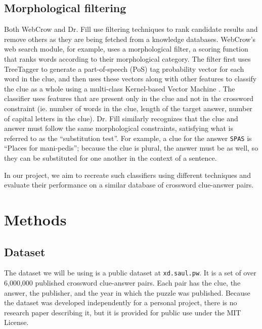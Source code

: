 \documentclass[11pt,a4paper]{article}
\begin{document}
\subsection{Morphological filtering}
Both WebCrow and Dr. Fill use filtering techniques to rank candidate results and remove others as they are being fetched from a knowledge databases. WebCrow's web search module, for example, uses a morphological filter, a scoring function that ranks words according to their morphological category. The filter first uses TreeTagger \cite{Schmid95-Improvements} to generate a part-of-speech (PoS) tag probability vector for each word in the clue, and then uses these vectors along with other features to classify the clue as a whole using a multi-class Kernel-based Vector Machine \cite{Tsochantaridis04-Support}. The classifier uses features that are present only in the clue and not in the crossword constraint (ie. number of words in the clue, length of the target answer, number of capital letters in the clue). Dr. Fill similarly recognizes that the clue and answer must follow the same morphological constraints, satisfying what is referred to as the ``substitution test''. For example, a clue for the answer \verb.SPAS. is ``Places for mani-pedis''; because the clue is plural, the answer must be as well, so they can be substituted for one another in the context of a sentence. 

In our project, we aim to recreate such classifiers using different techniques and evaluate their performance on a similar database of crossword clue-answer pairs.

\section{Methods}

\subsection{Dataset}
The dataset we will be using is a public dataset at \verb,xd.saul.pw,. It is a set of over 6,000,000 published crossword clue-answer pairs. Each pair has the clue, the answer, the publisher, and the year in which the puzzle was published. Because the dataset was developed independently for a personal project, there is no research paper describing it, but it is provided for public use under the MIT License.
\end{document}
